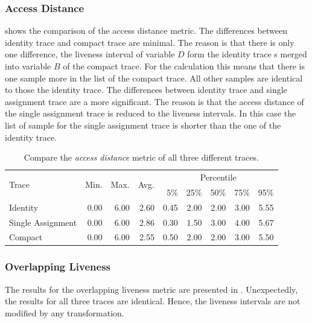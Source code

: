 \documentclass[onecolumn, openright, master, english, signatures]{dbrgrptt}
\begin{document}
\subsubsection{Access Distance}

 shows the comparison of the access distance metric.
The differences between identity \ac{trace} and compact \ac{trace} are minimal.
The reason is that there is only one difference, the liveness interval of variable $D$ form the identity \ac{trace} s merged into variable $B$ of the compact \ac{trace}.
For the calculation this means that there is one sample more in the list of the compact \ac{trace}.
All other samples are identical to those the identity \ac{trace}.
The differences between identity \ac{trace} and single assignment \ac{trace} are a more significant.
The reason is that the access distance of the single assignment \ac{trace} is reduced to the liveness intervals.
In this case the list of sample for the single assignment \ac{trace} is shorter than the one of the identity \ac{trace}.

\begin{table}[!ht]
  \centering
  \begin{tabular}{lrrrrrrrr}
    \hline
    \multirow{2}{*}{Trace} & \multirow{2}{*}{Min.} & \multirow{2}{*}{Max.} & \multirow{2}{*}{Avg.} & \multicolumn{5}{c}{Percentile} \tabularnewline
    & & & & 5\% & 25\% & 50\% & 75\% & 95\% \tabularnewline
    \hline
    Identity          & 0.00 & 6.00 & 2.60 & 0.45 & 2.00 & 2.00 & 3.00 & 5.55 \\
    Single Assignment & 0.00 & 6.00 & 2.86 & 0.30 & 1.50 & 3.00 & 4.00 & 5.67 \\
    Compact           & 0.00 & 6.00 & 2.55 & 0.50 & 2.00 & 2.00 & 3.00 & 5.50 \\
    \hline
  \end{tabular}
  \caption{Compare the \emph{access distance} metric of all three different \ac{trace}s.}
  \label{tab:summarizing-example-metrics-overview-access-distance}
\end{table}

\subsubsection{Overlapping Liveness}
The results for the overlapping liveness metric are presented in .
Unexpectedly, the results for all three \ac{trace}s are identical.
Hence, the liveness intervals are not modified by any transformation.
\end{document}
